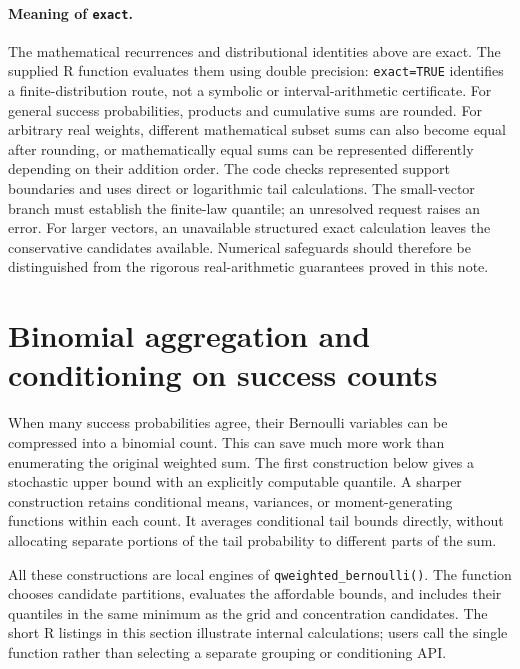 \documentclass[11pt,letterpaper]{article}
\numberwithin{equation}{section}
\theoremstyle{definition}
\theoremstyle{remark}
\begin{document}
\paragraph{Meaning of \texttt{exact}.}
The mathematical recurrences and distributional identities above are
exact.  The supplied R function evaluates them using double precision:
\texttt{exact=TRUE} identifies a finite-distribution route, not a symbolic
or interval-arithmetic certificate.  For general success probabilities,
products and cumulative sums are rounded.  For arbitrary real weights,
different mathematical subset sums can also become equal after rounding,
or mathematically equal sums can be represented differently depending on
their addition order. The code checks represented support boundaries and
uses direct or logarithmic tail calculations. The small-vector branch
must establish the finite-law quantile; an unresolved request raises an
error. For larger vectors, an unavailable structured exact calculation
leaves the conservative candidates available. Numerical safeguards should
therefore be distinguished from the rigorous real-arithmetic guarantees
proved in this note.

\section{Binomial aggregation and conditioning on success counts}
\label{sec:aggregation}

When many success probabilities agree, their Bernoulli variables can be
compressed into a binomial count. This can save much more work than
enumerating the original weighted sum. The first construction below gives
a stochastic upper bound with an explicitly computable quantile. A sharper
construction retains conditional means, variances, or moment-generating
functions within each count. It averages conditional tail bounds directly,
without allocating separate portions of the tail probability to different
parts of the sum.

All these constructions are local engines of
\texttt{qweighted\_bernoulli()}. The function chooses candidate partitions,
evaluates the affordable bounds, and includes their quantiles in the same
minimum as the grid and concentration candidates. The short R listings
in this section illustrate internal calculations; users call the single
function rather than selecting a separate grouping or conditioning API.
\end{document}
